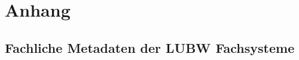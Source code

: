 \section{Anhang} \label{Anhang}
\subsection{Fachliche Metadaten der LUBW Fachsysteme} \label{Fachliche Metadaten der LUBW Fachsysteme}